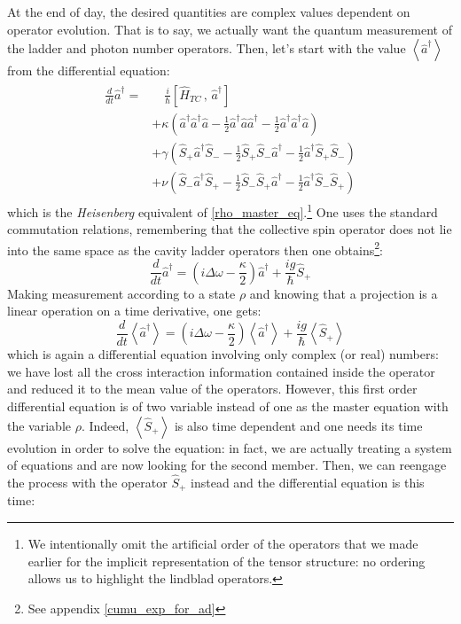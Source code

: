 \documentclass[11pt]{report}
\begin{document}
At the end of day, the desired quantities are complex values dependent on operator evolution. That is to say, we actually want the quantum measurement of the ladder and photon number operators. Then, let's start with the value $\left\langle\hat{a}^\dagger\right\rangle$ from the differential equation:
\begin{align}
\label{dtad_rough}
\begin{split}
\frac{d}{dt}\hat{a}^\dagger = &\quad\frac{i}{\hbar}\left[ \hat{H}_{TC}\, , \, \hat{a}^\dagger \right]\\
&+ \kappa \left( \hat{a}^\dagger \hat{a}^\dagger \hat{a} - \frac{1}{2} \hat{a}^\dagger \hat{a} \hat{a}^\dagger - \frac{1}{2} \hat{a}^\dagger \hat{a}^\dagger \hat{a} \right)\\
&+ \gamma \left( \hat{S}_+ \hat{a}^\dagger \hat{S}_- - \frac{1}{2} \hat{S}_+ \hat{S}_- \hat{a}^\dagger - \frac{1}{2} \hat{a}^\dagger \hat{S}_+ \hat{S}_- \right)\\
&+ \nu \left( \hat{S}_- \hat{a}^\dagger \hat{S}_+ - \frac{1}{2} \hat{S}_- \hat{S}_+ \hat{a}^\dagger - \frac{1}{2} \hat{a}^\dagger \hat{S}_- \hat{S}_+ \right)
\end{split}
\end{align}
which is the \textit{Heisenberg} equivalent of \eqref{rho_master_eq}.\footnote{We intentionally omit the artificial order of the operators that we made earlier for the implicit representation of the tensor structure: no ordering allows us to highlight the lindblad operators.} One uses the standard commutation relations, remembering that the collective spin operator does not lie into the same space as the cavity ladder operators then one obtains\footnote{See appendix \ref{cumu_exp_for_ad}}:
\begin{equation}
\label{ad_pure}
\frac{d}{dt}\hat{a}^\dagger = \left(i\Delta\omega - \frac{\kappa}{2} \right) \hat{a}^\dagger + \frac{ig}{\hbar} \hat{S}_+
\end{equation}
Making measurement according to a state $\rho$ and knowing that a projection is a linear operation on a time derivative, one gets:
\begin{equation}
\label{ad_mean_field}
\frac{d}{dt}\left\langle\hat{a}^\dagger\right\rangle = \left(i\Delta\omega - \frac{\kappa}{2} \right) \left\langle\hat{a}^\dagger\right\rangle + \frac{ig}{\hbar} \left\langle\hat{S}_+\right\rangle
\end{equation}
which is again a differential equation involving only complex (or real) numbers: we have lost all the cross interaction information contained inside the operator and reduced it to the mean value of the operators. However, this first order differential equation is of two variable instead of one as the master equation with the variable $\rho$. Indeed, $\left\langle\hat{S}_+\right\rangle$ is also time dependent and one needs its time evolution in order to solve the equation: in fact, we are actually treating a system of equations and are now looking for the second member. Then, we can reengage the process with the operator $\hat{S}_+$ instead and the differential equation is this time:
\end{document}
